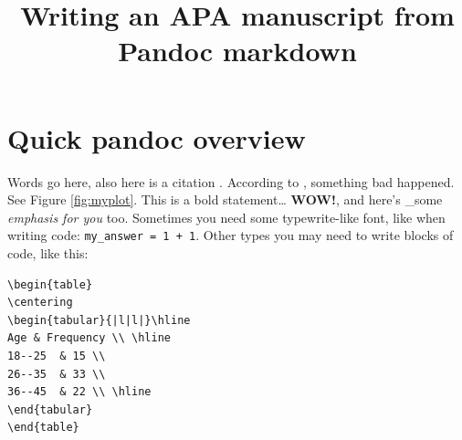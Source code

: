 \documentclass[doc,longtable]{apa6}
\title{Writing an APA manuscript from Pandoc markdown}
\begin{document}
\maketitle

\makeatletter
\def\LT@makenoprefixcaption#1#2#3{%
  \LT@mcol\LT@cols c{\hbox to\z@{\hss\parbox[t]\LTcapwidth{
    \sbox\@tempboxa{#1{}#3}
    \ifdim\wd\@tempboxa>\hsize
      #1{}#3
    \else
      \hbox to\hsize{\hfil\box\@tempboxa\hfil}%
    \fi
    \endgraf\vskip\baselineskip}
  \hss}}}
\makeatother

\makeatletter
\let\LT@oldmakecaption=\LT@makecaption
\let\oldthetable=\thetable
\let\oldtheHtable=\theHtable
\makeatother

\makeatletter
{}
\newenvironment{no-prefix-table-caption}{
  \let\LT@makecaption=\LT@makenoprefixcaption
  \renewcommand\thetable{x.\thetableno}
  \renewcommand\theHtable{x.\thetableno}
  \stepcounter{tableno}
}{
  \let\thetable=\oldthetable
  \let\theHtable=\oldtheHtable
  \let\LT@makecaption=\LT@oldmakecaption
  \addtocounter{table}{-1}
}
\makeatother

\hypertarget{quick-pandoc-overview}{%
\section{Quick pandoc overview}\label{quick-pandoc-overview}}

Words go here, also here is a citation \autocite{someArticle}. According
to \textcite{anotherArticle}, something bad happened. See Figure
\ref{fig:myplot}. This is a bold statement\ldots{} \textbf{WOW!}, and
here's \_some \emph{emphasis for you} too. Sometimes you need some
typewrite-like font, like when writing code:
\texttt{my\_answer\ =\ 1\ +\ 1}. Other types you may need to write
blocks of code, like this:

\begin{verbatim}
\begin{table}
\centering
\begin{tabular}{|l|l|}\hline
Age & Frequency \\ \hline
18--25  & 15 \\
26--35  & 33 \\
36--45  & 22 \\ \hline
\end{tabular}
\end{table}
\end{verbatim}
\end{document}
